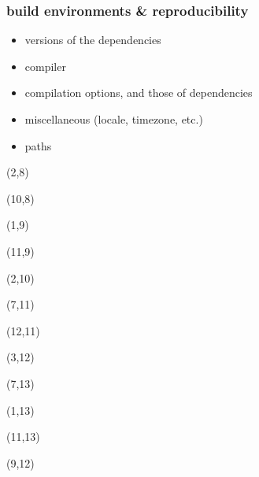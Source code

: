 \documentclass{beamer}
\begin{document}
\begin{frame}
  \frametitle{build environments \& reproducibility}

  \vspace{-2cm}
  \begin{itemize}
    \item \alert{versions} of the dependencies
    \item \alert{compiler}
    \item \alert{compilation options}, and those of dependencies
    \item \alert{miscellaneous} (locale, timezone, etc.)
    \item \alert{paths}
  \end{itemize}
  \vspace{1.5cm}

  \begin{textblock}{8}(2,8)
  \end{textblock}
  \begin{textblock}{8}(10,8)
  \end{textblock}

  \begin{textblock}{8}(1,9)
  \end{textblock}
  \begin{textblock}{8}(11,9)
  \end{textblock}

  \begin{textblock}{8}(2,10)
  \end{textblock}
  \begin{textblock}{8}(7,11)
  \end{textblock}
  \begin{textblock}{8}(12,11)
  \end{textblock}

  \begin{textblock}{8}(3,12)
  \end{textblock}
  \begin{textblock}{8}(7,13)
  \end{textblock}
  \begin{textblock}{8}(1,13)
  \end{textblock}
  \begin{textblock}{8}(11,13)
  \end{textblock}
  \begin{textblock}{8}(9,12)
  \end{textblock}


\end{frame}
\end{document}
